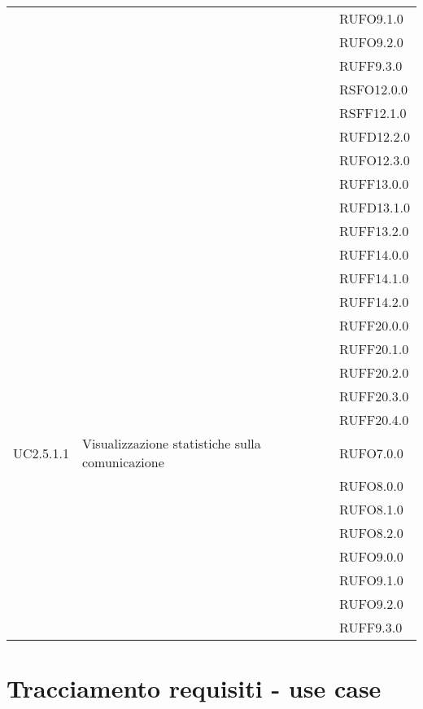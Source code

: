 \begin{center}
\begin{longtable}{lp{}l}
 &  & RUFO9.1.0 \\
 &  & RUFO9.2.0 \\
 &  & RUFF9.3.0 \\
 &  & RSFO12.0.0 \\
 &  & RSFF12.1.0 \\
 &  & RUFD12.2.0 \\
 &  & RUFO12.3.0 \\
 &  & RUFF13.0.0 \\
 &  & RUFD13.1.0 \\
 &  & RUFF13.2.0 \\
 &  & RUFF14.0.0 \\
 &  & RUFF14.1.0 \\
 &  & RUFF14.2.0 \\
 &  & RUFF20.0.0 \\
 &  & RUFF20.1.0 \\
 &  & RUFF20.2.0 \\
 &  & RUFF20.3.0 \\
 &  & RUFF20.4.0 \\
UC2.5.1.1 & Visualizzazione statistiche sulla comunicazione & RUFO7.0.0 \\
 &  & RUFO8.0.0 \\
 &  & RUFO8.1.0 \\
 &  & RUFO8.2.0 \\
 &  & RUFO9.0.0 \\
 &  & RUFO9.1.0 \\
 &  & RUFO9.2.0 \\
 &  & RUFF9.3.0 \\
\bottomrule
\end{longtable}
\end{center}
\newpage\section{Tracciamento requisiti - use case}\label{sec:tracciamento}

